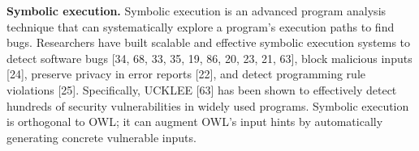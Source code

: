 \noindent
\textbf{Symbolic execution.} Symbolic execution is an advanced program
analysis technique that can systematically explore a program’s
execution paths to find bugs. Researchers have built
scalable and effective symbolic execution systems to detect
software bugs [34, 68, 33, 35, 19, 86, 20, 23, 21, 63], block
malicious inputs [24], preserve privacy in error reports [22],
and detect programming rule violations [25]. Specifically,
UCKLEE [63] has been shown to effectively detect hundreds
of security vulnerabilities in widely used programs. Symbolic
execution is orthogonal to OWL; it can augment OWL’s input
hints by automatically generating concrete vulnerable inputs.

